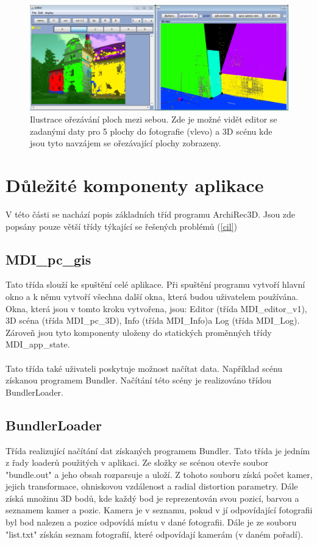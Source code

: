 \documentclass[11pt,twoside,a4paper]{book}
\begin{document}
\begin{figure}[]
	\begin{center}
		\includegraphics[width=15cm]{ilustrace/program/P-3}
		\caption{Ilustrace ořezávání ploch mezi sebou. Zde je možné vidět editor se zadanými daty pro 5 plochy do fotografie (vlevo) a 3D scénu kde jsou tyto navzájem se ořezávající plochy zobrazeny. }
		\label{fig:P-3}
	\end{center}
\end{figure}

\clearpage


\section{Důležité komponenty aplikace}
V této části se nachází popis základních tříd programu ArchiRec3D. Jsou zde popsány pouze větší třídy týkající se řešených problémů (\ref{cil}) 

\subsection{MDI\_pc\_gis}
Tato třída slouží ke spuštění celé aplikace. Při spuštění programu vytvoří hlavní okno a k němu vytvoří všechna další okna, která budou uživatelem používána. Okna, která jsou v tomto kroku vytvořena, jsou: Editor (třída MDI\_editor\_v1), 3D scéna (třída MDI\_pc\_3D), Info (třída MDI\_Info)a Log (třída MDI\_Log). Zároveň jsou tyto komponenty uloženy do statických proměnných třídy MDI\_app\_state.
\paragraph{} 
Tato třída také uživateli poskytuje možnost načítat data. Například scénu získanou programem Bundler. Načítání této scény je realizováno třídou BundlerLoader.

\subsection{BundlerLoader}
Třída realizující načítání dat získaných programem Bundler. Tato třída je jedním z řady loaderů použitých v aplikaci. Ze složky se scénou otevře soubor "bundle.out" a jeho obsah rozparsuje a uloží. Z tohoto souboru získá počet kamer, jejich transformace, ohniskovou vzdálenost a radial distortion parametry. Dále získá množinu 3D bodů, kde každý bod je reprezentován svou pozicí, barvou a seznamem kamer a pozic. Kamera je v seznamu, pokud v jí odpovídající fotografii byl bod nalezen a pozice odpovídá místu v dané fotografii. Dále je ze souboru "list.txt" získán seznam fotografií, které odpovídají kamerám (v daném pořadí). 
\end{document}
